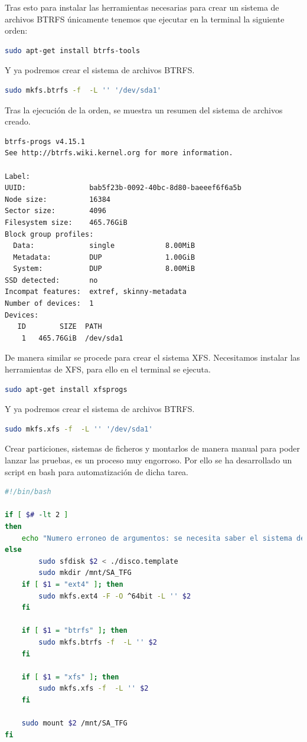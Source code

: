 Tras esto para instalar las herramientas necesarias para crear un sistema de archivos BTRFS únicamente tenemos que ejecutar en la terminal la siguiente orden:
\begin{lstlisting}[language=bash]
sudo apt-get install btrfs-tools
\end{lstlisting}
Y ya podremos crear el sistema de archivos BTRFS.
\begin{lstlisting}[language=bash]
sudo mkfs.btrfs -f  -L '' '/dev/sda1'
\end{lstlisting}
Tras la ejecución de la orden, se muestra un resumen del sistema de archivos creado.
\begin{lstlisting}[language=bash]
btrfs-progs v4.15.1
See http://btrfs.wiki.kernel.org for more information.

Label:
UUID:               bab5f23b-0092-40bc-8d80-baeeef6f6a5b
Node size:          16384
Sector size:        4096
Filesystem size:    465.76GiB
Block group profiles:
  Data:             single            8.00MiB
  Metadata:         DUP               1.00GiB
  System:           DUP               8.00MiB
SSD detected:       no
Incompat features:  extref, skinny-metadata
Number of devices:  1
Devices:
   ID        SIZE  PATH
    1   465.76GiB  /dev/sda1

\end{lstlisting}

De manera similar se procede para crear el sistema XFS. Necesitamos instalar las herramientas de XFS, para ello en el terminal se ejecuta. 
\begin{lstlisting}[language=bash]
sudo apt-get install xfsprogs
\end{lstlisting}
Y ya podremos crear el sistema de archivos BTRFS.
\begin{lstlisting}[language=bash]
sudo mkfs.xfs -f  -L '' '/dev/sda1'
\end{lstlisting}

Crear particiones, sistemas de ficheros y montarlos de manera manual para poder lanzar las pruebas, es un proceso muy engorroso. Por ello se ha desarrollado un script en bash para automatización de dicha tarea. 

\begin{lstlisting}[language=bash]
#!/bin/bash

if [ $# -lt 2 ]
then
	echo "Numero erroneo de argumentos: se necesita saber el sistema de archivos, la ruta del dispositivo"
else
		sudo sfdisk $2 < ./disco.template
		sudo mkdir /mnt/SA_TFG 
	if [ $1 = "ext4" ]; then
		sudo mkfs.ext4 -F -O ^64bit -L '' $2
	fi

	if [ $1 = "btrfs" ]; then
		sudo mkfs.btrfs -f  -L '' $2
	fi

	if [ $1 = "xfs" ]; then
		sudo mkfs.xfs -f  -L '' $2
	fi

	sudo mount $2 /mnt/SA_TFG
fi
\end{lstlisting}





